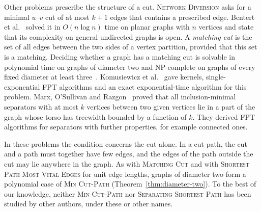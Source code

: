\documentclass[a4paper,fleqn]{cas-sc}
\numberwithin{equation}{section}
\theoremstyle{definition}
\theoremstyle{plain}
\theoremstyle{remark}
\newcommand{\MinCutPath}{\textsc{Min Cut-Path}}
\newcommand{\SSP}{\textsc{Separating Shortest Path}}
\begin{document}
Other problems prescribe the structure of a cut.
\textsc{Network Diversion} asks for a minimal $u$--$v$ cut of at most $k+1$ edges that contains a prescribed edge.
Bentert et al.~\cite{Bentert2025NetworkDiversion} solved it in $O(n \log n)$ time on planar graphs with $n$ vertices and state that its complexity on general undirected graphs is open.
A \emph{matching cut} is the set of all edges between the two sides of a vertex partition, provided that this set is a matching.
Deciding whether a graph has a matching cut is solvable in polynomial time on graphs of diameter two and NP-complete on graphs of every fixed diameter at least three~\cite{LeLe2019MatchingCut}.
Komusiewicz et al.~\cite{Komusiewicz2020MatchingCut} gave kernels, single-exponential FPT algorithms and an exact exponential-time algorithm for this problem.
Marx, O'Sullivan and Razgon~\cite{Marx2013Separators} proved that all inclusion-minimal separators with at most $k$ vertices between two given vertices lie in a part of the graph whose torso has treewidth bounded by a function of $k$.
They derived FPT algorithms for separators with further properties, for example connected ones.

In these problems the condition concerns the cut alone.
In a cut-path, the cut and a path must together have few edges, and the edges of the path outside the cut may lie anywhere in the graph.
As with \textsc{Matching Cut} and with \textsc{Shortest Path Most Vital Edges} for unit edge lengths, graphs of diameter two form a polynomial case of \MinCutPath{} (Theorem~\ref{thm:diameter-two}).
To the best of our knowledge, neither \MinCutPath{} nor \SSP{} has been studied by other authors, under these or other names.
\end{document}
